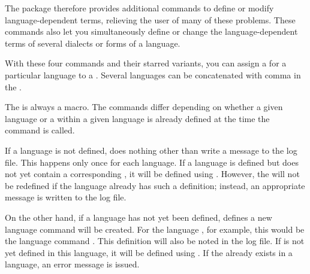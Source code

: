 The  package therefore provides additional commands to define
or modify language-dependent terms, relieving the user of many of these
problems. These commands also let you simultaneously define or change the
language-dependent terms of several dialects or forms of a language.

\begin{Declaration}
\end{Declaration}
With these four commands and their starred variants, you can assign a
 for a particular language to a . Several
languages can be concatenated with comma in the .

The  is always a macro. The commands differ depending on whether a
given language or a  within a given language is already defined at
the time the command is called.

If a language is not defined,  does nothing other
than write a message to the log file. This happens only once for each
language. If a language is defined but does not yet contain a corresponding
, it will be defined using . However, the
 will not be redefined if the language already has such a
definition; instead, an appropriate message is written to the log file.

On the other hand, if a language has not yet been defined,
 defines a new language command will be created. For the
language , for example, this would be the language command
. This definition will also be noted in the log file.
If  is not yet defined in this language, it will be defined using
. If the  already exists in a language, an error
message is issued.

